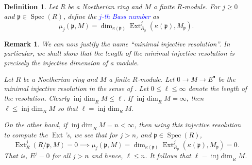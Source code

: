 \documentclass[10pt]{article}
\theoremstyle{thmstyle}
\theoremstyle{defstyle}
\newtheorem{definition}[theorem]{Definition}
\newtheorem{remark}[theorem]{Remark}
\newcommand{\Spec}{\operatorname{Spec}}
\newcommand{\frakp}{\mathfrak{p}} %
\newcommand{\define}[1]{\textcolor{blue}{\textit{#1}}}
\renewcommand{\le}{\leqslant}
\renewcommand{\ge}{\geqslant}
\newcommand{\Ext}{\operatorname{Ext}}
\newcommand{\injdim}{\operatorname{inj~dim}}
\begin{document}
\begin{definition}
    Let $R$ be a Noetherian ring and $M$ a finite $R$-module. For $j\ge 0$ and $\frakp\in\Spec(R)$, define the \define{$j$-th Bass number} as 
    \begin{equation*}
        \mu_j\left(\frakp, M\right) = \dim_{\kappa(\frakp)}\Ext_{R_\frakp}^j\left(\kappa(\frakp), M_\frakp\right).
    \end{equation*}
\end{definition}

\begin{remark}
    We can now justify the name ``minimal injective resolution''. In particular, we shall show that the length of the minimal injective resolution is precisely the injective dimension of a module. 
    
    Let $R$ be a Noetherian ring and $M$ a finite $R$-module. Let $0\to M\to E^\bullet$ be \emph{the} minimal injective resolution in the sense of . Let $0\le\ell\le\infty$ denote the length of the resolution. Clearly $\injdim_R M\le\ell$. If $\injdim_R M = \infty$, then $\ell\le\injdim_R M$ so that $\ell = \injdim_R M$. 

    On the other hand, if $\injdim_R M = n < \infty$, then using this injective resolution to compute the $\Ext$'s, we see that for $j > n$, and $\frakp\in\Spec(R)$, 
    \begin{equation*}
        \Ext^{j}_R(R/\frakp, M) = 0\implies\mu_j(\frakp, M) = \dim_{\kappa(\frakp)}\Ext^{j}_{R_\frakp}\left(\kappa(\frakp), M_\frakp\right) = 0.
    \end{equation*}
    That is, $E^j = 0$ for all $j > n$ and hence, $\ell\le n$. It follows that $\ell = \injdim_R M$.
\end{remark}
\end{document}
